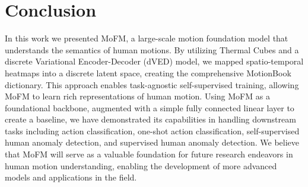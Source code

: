 \section{Conclusion}
\label{sec:conslusion}

In this work we presented MoFM, a large-scale motion foundation model that understands the semantics of human motions. By utilizing Thermal Cubes and a discrete Variational Encoder-Decoder (dVED) model, we mapped spatio-temporal heatmaps into a discrete latent space, creating the comprehensive MotionBook dictionary. This approach enables task-agnostic self-supervised training, allowing MoFM to learn rich representations of human motion. Using MoFM as a foundational backbone, augmented with a simple fully connected linear layer to create a baseline, we have demonstrated its capabilities in handling downstream tasks including action classification, one-shot action classification, self-supervised human anomaly detection, and supervised human anomaly detection. We believe that MoFM will serve as a valuable foundation for future research endeavors in human motion understanding, enabling the development of more advanced models and applications in the field.